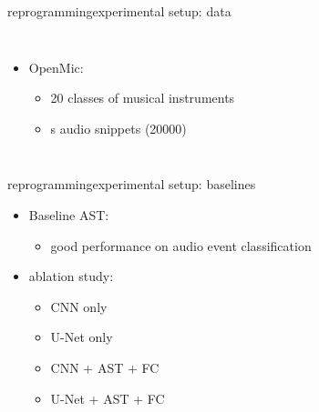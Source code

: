 \begin{frame}{reprogramming}{experimental setup: data}
    \begin{columns}
            \begin{itemize}
                \item   OpenMic:
                    \begin{itemize}
                        \item   20 classes of musical instruments
                        \item   \unit[10]{s} audio snippets (20000)
                    \end{itemize}
            \end{itemize}
    \end{columns}
\end{frame}

\begin{frame}{reprogramming}{experimental setup: baselines}
    \begin{itemize}
        \item Baseline AST:
            \begin{itemize}
                \item   good performance on audio event classification
            \end{itemize}
        \bigskip
        \item   ablation study:
            \begin{itemize}
                \item   CNN only
                \item   U-Net only
                \item   CNN + AST + FC
                \item   U-Net + AST + FC
            \end{itemize}
    \end{itemize}
\end{frame}


